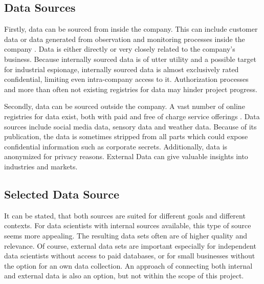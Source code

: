 	\subsection{Data Sources}
	Firstly, data can be sourced from inside the company. This can include customer data or data generated from observation and monitoring processes inside the company \cite{internalExternalData}. Data is either directly or very closely related to the company's business. Because internally sourced data is of utter utility and a possible target for industrial espionage, internally sourced data is almost exclusively rated confidential, limiting even intra-company access to it. Authorization processes and more than often not existing registries for data may hinder project progress.
	
	Secondly, data can be sourced outside the company. A vast number of online registries for data exist, both with paid and free of charge service offerings \cite{whyExternalData}. Data sources include social media data, sensory data and weather data. Because of its publication, the data is sometimes stripped from all parts which could expose confidential information such as corporate secrets. Additionally, data is anonymized for privacy reasons. External Data can give valuable insights into industries and markets.
	

	
	\subsection{Selected Data Source}
	It can be stated, that both sources are suited for different goals and different contexts. For data scientists with internal sources available, this type of source seems more appealing. The resulting data sets often are of higher quality and relevance. Of course, external data sets are important especially for independent data scientists without access to paid databases, or for small businesses without the option for an own data collection. An approach of connecting both internal and external data is also an option, but not within the scope of this project.
	
